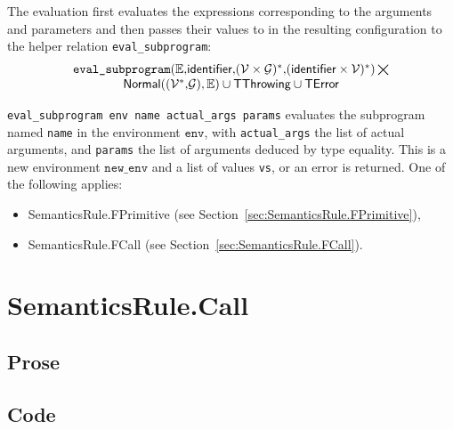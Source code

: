 \documentclass{book}
\newcommand\XGraphs[0]{\mathcal{G}}
\newcommand\vals[0]{\mathcal{V}}
\newcommand\aslrel[0]{\bigtimes}
\newcommand\aslsep[0]{\mathbf{,}}
\newcommand\TError[0]{\textsf{TError}}
\newcommand\TThrowing[0]{\textsf{TThrowing}}
\newcommand\evalsubprogram[1]{\texttt{eval\_subprogram}(#1)}
\newcommand\Normal[0]{\textsf{Normal}}
\newcommand\newenv[0]{\texttt{new\_env}}
\newcommand\env[0]{\texttt{env}}
\begin{document}
The evaluation first evaluates the expressions corresponding to the arguments
and parameters and then passes their values to in the resulting configuration
to the helper relation \texttt{eval\_subprogram}:
\[
  \begin{array}{c}
    \evalsubprogram{\envs \aslsep \identifier \aslsep (\vals \times \XGraphs)^* \aslsep (\identifier\times\vals)^*} \aslrel \\
    \Normal((\vals^* \aslsep \XGraphs), \envs) \cup \TThrowing \cup \TError
  \end{array}
\]

\texttt{eval\_subprogram env name actual\_args params} evaluates the subprogram \\
named \texttt{name} in the environment $\env$, with
\texttt{actual\_args} the list of actual arguments, and \texttt{params} the
list of arguments deduced by type equality. This is a new environment
$\newenv$ and a list of values \texttt{vs}, or an error is returned.
One of the following applies:
\begin{itemize}
\item SemanticsRule.FPrimitive (see Section~\ref{sec:SemanticsRule.FPrimitive}),
\item SemanticsRule.FCall (see Section~\ref{sec:SemanticsRule.FCall}).
\end{itemize}

\section{SemanticsRule.Call \label{sec:SemanticsRule.Call}}

\subsection{Prose}

\subsection{Code}
\end{document}
